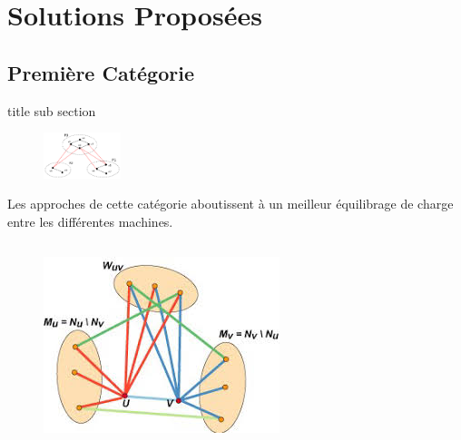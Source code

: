\section{Solutions Proposées}
\subsection{Première Catégorie}
\begin{frame}{title sub section}
\begin{figure}
	\vspace{-35pt}
	\begin{center}
		\includegraphics[width=0.2\textwidth]{resources/partitions}
	\end{center}
	\vspace{-35pt}
	\end{figure}
       Les approches de cette catégorie aboutissent à un meilleur équilibrage de charge entre les différentes machines.
       
       
		\begin{columns}
      		\begin{column}{0.3\textwidth}
   				\only<2->
      			{
	      			\begin{figure}
	      				\centering
	      				\includegraphics[width=\linewidth]{resources/transitions}
	      			\end{figure}   
      			}   			
      		\end{column}
      	

\end{columns}
\end{frame}
